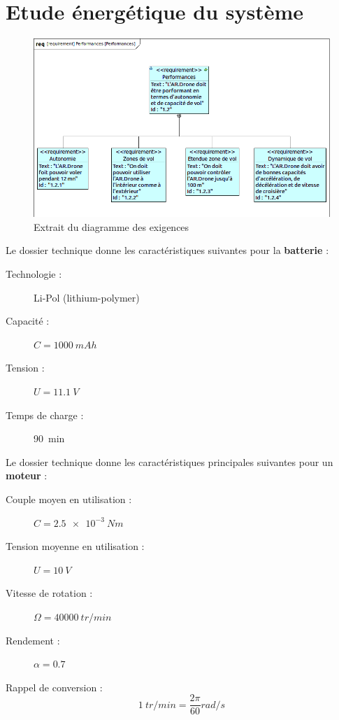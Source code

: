 \documentclass[10pt,fleqn]{article} %
\begin{document}
\section{Etude énergétique du système}

\begin{figure}
    \centering
    \includegraphics[height=0.3\textheight]{images/exigence_drone.png}
    \caption{Extrait du diagramme des exigences}
    \label{fig:exi}
\end{figure}

Le dossier technique donne les caractéristiques suivantes pour la \textbf{batterie} :
\begin{description}
 \item[Technologie :] Li-Pol (lithium-polymer)
\item[Capacité :] $ C = \SI{1000}{mAh} $
\item[Tension :] $U=\SI{11.1}{V}$
\item[Temps de charge :] \SI{90}{min}
\end{description}

Le dossier technique donne les caractéristiques principales suivantes pour un \textbf{moteur} :
\begin{description}
    \item[Couple moyen en utilisation : ] $C = \SI{2.5e-3}{Nm}$
    \item[Tension moyenne en utilisation : ] $U = \SI{10}{V}$
    \item[Vitesse de rotation : ] $\Omega = \SI{40000}{tr/min}$
    \item[Rendement : ] $\alpha = 0.7$
\end{description}

Rappel de conversion : $$\SI{1}{tr/min} = \frac{2\pi}{60}\si{rad/s}$$
\end{document}
